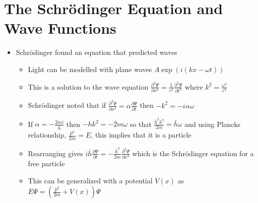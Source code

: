 \documentclass[12pt]{article}
\begin{document}
\section{The Schr\"{o}dinger Equation and Wave Functions} \begin{itemize}
    \item Schr\"{o}dinger found an equation that predicted waves \begin{itemize}
        \item Light can be modelled with plane waves $A \exp(i(kx-\omega t))$
        \item This is a solution to the wave equation $\frac{\partial^2 \varPsi }{\partial x^2} = \frac{1}{c^2} \frac{\partial^2 \varPsi}{\partial t^2}$ where $k^2 = \frac{\omega^2}{c^2}$
        \item Schr\"{o}dinger noted that if $\frac{\partial^2 \varPsi}{\partial x^2} = \alpha \frac{\partial \varPsi}{\partial t}$ then $-k^2 = -i \alpha \omega$
        \item If $\alpha = - \frac{2mi}{\bar{h}}$ then $-hk^2 = -2m \omega$ so that $\frac{\bar{h}^2k^2}{2m} = \bar{h} \omega$ and using Plancks relationship, $\frac{p^2}{2m} = E$, this implies that it is a particle
        \item Rearranging gives $i \bar{h} \frac{\partial \varPsi}{\partial t} = - \frac{\bar{h}^2}{2m} \frac{\partial^2 \varPsi}{\partial x^2}$ which is the Schr\"{o}dinger equation for a free particle
        \item This can be generalized with a potential $V(x)$ as $E \varPsi = \left(\frac{p^2}{2m} + V(x) \right) \varPsi$
 

\end{itemize}
\end{itemize}
\end{document}
